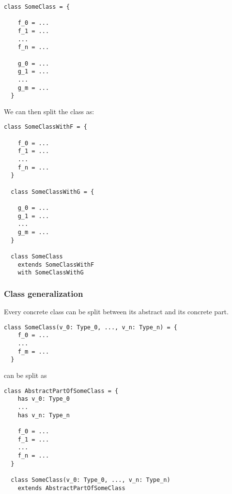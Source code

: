 \begin{lstlisting}[label={lst:rewritingClassSplitBefore}]
  class SomeClass = {

    f_0 = ...
    f_1 = ...
    ...
    f_n = ...

    g_0 = ...
    g_1 = ...
    ...
    g_m = ...
  }
\end{lstlisting}

We can then split the class as:

\begin{lstlisting}[label={lst:rewritingClassSplitAfter}]
  class SomeClassWithF = {

    f_0 = ...
    f_1 = ...
    ...
    f_n = ...
  }

  class SomeClassWithG = {

    g_0 = ...
    g_1 = ...
    ...
    g_m = ...
  }

  class SomeClass
    extends SomeClassWithF
    with SomeClassWithG
\end{lstlisting}

\subsubsection{Class generalization}

Every concrete class can be split between its abstract and its concrete part.

\begin{lstlisting}[label={lst:rewritingClassGeneralizationBefore}]
  class SomeClass(v_0: Type_0, ..., v_n: Type_n) = {
    f_0 = ...
    ...
    f_m = ...
  }
\end{lstlisting}

can be split as

\begin{lstlisting}[label={lst:rewritingClassGeneralizationAfter}]
  class AbstractPartOfSomeClass = {
    has v_0: Type_0
    ...
    has v_n: Type_n

    f_0 = ...
    f_1 = ...
    ...
    f_n = ...
  }

  class SomeClass(v_0: Type_0, ..., v_n: Type_n)
    extends AbstractPartOfSomeClass
\end{lstlisting}


